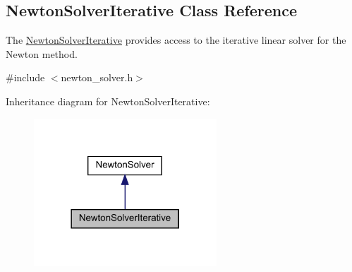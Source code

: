 \hypertarget{classamici_1_1_newton_solver_iterative}{}\subsection{Newton\+Solver\+Iterative Class Reference}
\label{classamici_1_1_newton_solver_iterative}


The \mbox{\hyperlink{classamici_1_1_newton_solver_iterative}{Newton\+Solver\+Iterative}} provides access to the iterative linear solver for the Newton method.  




{\ttfamily \#include $<$newton\+\_\+solver.\+h$>$}



Inheritance diagram for Newton\+Solver\+Iterative\+:
\nopagebreak
\begin{figure}[H]
\begin{center}
\leavevmode
\includegraphics[width=194pt]{classamici_1_1_newton_solver_iterative__inherit__graph}
\end{center}
\end{figure}
